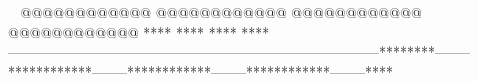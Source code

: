     @@@@@@@@@@@@        @@@@@@@@@@@@        @@@@@@@@@@@@        @@@@@@@@@@@@            ****                ****                ****                ****        --------------------------------------------------------------------------------********--------************--------************--------************--------****                                                                                 